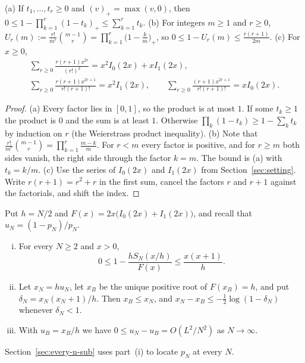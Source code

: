 \begin{lemma}\label{lem:clipped}
(a) If $t_1,\dots,t_r\ge0$ and $(v)_+=\max(v,0)$, then
$0\le1-\prod_{k=1}^r(1-t_k)_+\le\sum_{k=1}^rt_k$.
(b) For integers $m\ge1$ and $r\ge0$,
$U_r(m):=\frac{r!}{m^r}\binom{m-1}{r}=\prod_{k=1}^r\bigl(1-\frac km\bigr)_+$,
so $0\le1-U_r(m)\le\frac{r(r+1)}{2m}$.
(c) For $x\ge0$,
\begin{gather*}
\sum_{r\ge0}\frac{r(r+1)x^{2r}}{(r!)^2}=x^2I_0(2x)+xI_1(2x),\\
\sum_{r\ge0}\frac{r(r+1)x^{2r+1}}{r!(r+1)!}=x^2I_1(2x),\qquad
\sum_{r\ge0}\frac{(r+1)x^{2r+1}}{r!(r+1)!}=xI_0(2x).
\end{gather*}
\end{lemma}

\begin{proof}
(a) Every factor lies in $[0,1]$, so the product is at most $1$. If some
$t_k\ge1$ the product is $0$ and the sum is at least $1$. Otherwise
$\prod_k(1-t_k)\ge1-\sum_kt_k$ by induction on $r$ (the Weierstrass
product inequality). (b) Note that
$\frac{r!}{m^r}\binom{m-1}{r}=\prod_{k=1}^r\frac{m-k}m$. For $r<m$ every factor
is positive, and for $r\ge m$ both sides vanish, the right side through the
factor $k=m$. The bound is (a) with $t_k=k/m$. (c) Use the series of $I_0(2x)$
and $I_1(2x)$ from Section~\ref{sec:setting}. Write $r(r+1)=r^2+r$ in the
first sum, cancel the factors $r$ and $r+1$ against the factorials, and shift
the index.
\end{proof}

\begin{theorem}\label{thm:bessel}
Put $h=N/2$ and $F(x)=2x\bigl(I_0(2x)+I_1(2x)\bigr)$, and recall that
$u_N=(1-p_N)/p_N$.
\begin{enumerate}[(i)]
\item For every $N\ge2$ and $x>0$,
\begin{equation}\label{eq:uniformbessel}
0\le1-\frac{hS_N(x/h)}{F(x)}\le\frac{x(x+1)}h.
\end{equation}
\item Let $x_N=hu_N$, let $x_B$ be the unique positive root of $F(x_B)=h$, and
put $\delta_N=x_N(x_N+1)/h$. Then $x_B\le x_N$, and
$x_N-x_B\le-\frac12\log(1-\delta_N)$ whenever $\delta_N<1$.
\item With $u_B=x_B/h$ we have $0\le u_N-u_B=O(L^2/N^2)$ as $N\to\infty$.
\end{enumerate}
\end{theorem}

Section~\ref{sec:every-n-sub} uses part~(i) to locate $p_N$ at every $N$.


